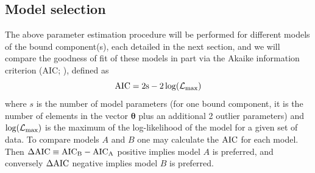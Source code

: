 \subsection{Model selection}
The above parameter estimation procedure will be performed for different models of the bound component(s), each detailed in the next section, and we will compare the goodness of fit of these models in part via the Akaike information criterion (AIC; \cite{AIC}), defined as
\begin{equation}\label{eq:AIC}
    \rm{AIC} = 2s - 2\log(\mathcal{L}_{\rm{max}})
\end{equation}
where $s$ is the number of model parameters (for one bound component, it is the number of elements in the vector $\mathbf{\theta}$ plus an additional 2 outlier parameters) and $\log(\mathcal{L}_{\rm{max}})$ is the maximum of the log-likelihood of the model for a given set of data. To compare models $A$ and $B$ one may calculate the $\rm{AIC}$ for each model. Then $\Delta\rm{AIC} \equiv \rm{AIC}_B - \rm{AIC}_A$ positive implies model $A$ is preferred, and conversely $\Delta\rm{AIC}$ negative implies model $B$ is preferred. 

